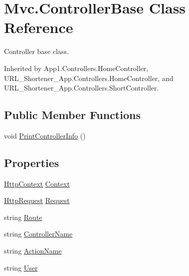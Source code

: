 \hypertarget{class_mvc_1_1_controller_base}{}\section{Mvc.\+Controller\+Base Class Reference}
\label{class_mvc_1_1_controller_base}


Controller base class.  




Inherited by App1.\+Controllers.\+Home\+Controller, U\+R\+L\+\_\+\+Shortener\+\_\+\+App.\+Controllers.\+Home\+Controller, and U\+R\+L\+\_\+\+Shortener\+\_\+\+App.\+Controllers.\+Short\+Controller.

\subsection*{Public Member Functions}
\begin{DoxyCompactItemize}
\item 
void \hyperlink{class_mvc_1_1_controller_base_a57d2cea3763d2808292b32f1020113da}{Print\+Controller\+Info} ()
\end{DoxyCompactItemize}
\subsection*{Properties}
\begin{DoxyCompactItemize}
\item 
\hyperlink{class_p_http_1_1_http_context}{Http\+Context} \hyperlink{class_mvc_1_1_controller_base_a092ca6680a5ca70438cec19e480e7297}{Context}
\item 
\hyperlink{class_p_http_1_1_http_request}{Http\+Request} \hyperlink{class_mvc_1_1_controller_base_a754fc64c89e27a494101491824173bd1}{Request}
\item 
string \hyperlink{class_mvc_1_1_controller_base_a81657d2312f0c4830fb6ae678654600b}{Route}
\item 
string \hyperlink{class_mvc_1_1_controller_base_a1f28423c7f9c603f705459c1fb82d21b}{Controller\+Name}
\item 
string \hyperlink{class_mvc_1_1_controller_base_ae79bdad6f98b08d8a65efb7d3c1ab2d7}{Action\+Name}
\item 
string \hyperlink{class_mvc_1_1_controller_base_ae7690bfb498ff3be9dc850918a2a2e2b}{User}
\end{DoxyCompactItemize}


